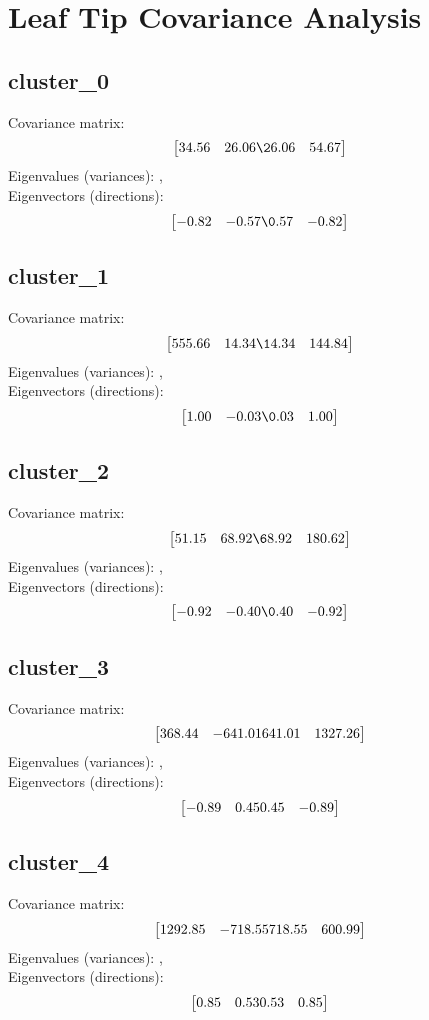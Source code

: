 \documentclass{article}
\begin{document}
\section*{Leaf Tip Covariance Analysis}
\subsection*{cluster_0}
Covariance matrix:
\[\begin{bmatrix}34.56 & 26.06 \26.06 & 54.67\end{bmatrix}\]
Eigenvalues (variances): , \\
Eigenvectors (directions):
\[\begin{bmatrix}-0.82 & -0.57 \0.57 & -0.82\end{bmatrix}\]
\subsection*{cluster_1}
Covariance matrix:
\[\begin{bmatrix}555.66 & 14.34 \14.34 & 144.84\end{bmatrix}\]
Eigenvalues (variances): , \\
Eigenvectors (directions):
\[\begin{bmatrix}1.00 & -0.03 \0.03 & 1.00\end{bmatrix}\]
\subsection*{cluster_2}
Covariance matrix:
\[\begin{bmatrix}51.15 & 68.92 \68.92 & 180.62\end{bmatrix}\]
Eigenvalues (variances): , \\
Eigenvectors (directions):
\[\begin{bmatrix}-0.92 & -0.40 \0.40 & -0.92\end{bmatrix}\]
\subsection*{cluster_3}
Covariance matrix:
\[\begin{bmatrix}368.44 & -641.01 \-641.01 & 1327.26\end{bmatrix}\]
Eigenvalues (variances): , \\
Eigenvectors (directions):
\[\begin{bmatrix}-0.89 & 0.45 \-0.45 & -0.89\end{bmatrix}\]
\subsection*{cluster_4}
Covariance matrix:
\[\begin{bmatrix}1292.85 & -718.55 \-718.55 & 600.99\end{bmatrix}\]
Eigenvalues (variances): , \\
Eigenvectors (directions):
\[\begin{bmatrix}0.85 & 0.53 \-0.53 & 0.85\end{bmatrix}\]
\end{document}

